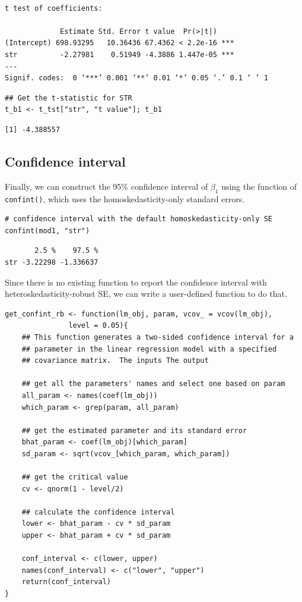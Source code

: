 \documentclass[11pt]{article}
\begin{document}
\begin{verbatim}

t test of coefficients:

             Estimate Std. Error t value  Pr(>|t|)
(Intercept) 698.93295   10.36436 67.4362 < 2.2e-16 ***
str          -2.27981    0.51949 -4.3886 1.447e-05 ***
---
Signif. codes:  0 ‘***’ 0.001 ‘**’ 0.01 ‘*’ 0.05 ‘.’ 0.1 ‘ ’ 1
\end{verbatim}

\begin{verbatim}
## Get the t-statistic for STR
t_b1 <- t_tst["str", "t value"]; t_b1
\end{verbatim}

\begin{verbatim}
[1] -4.388557
\end{verbatim}


\subsection*{Confidence interval}
\label{sec:org136b84d}

Finally, we can construct the 95\% confidence interval of \(\beta_1\)
using the function of \texttt{confint()}, which uses the
homoskedasticity-only standard errors.
\begin{verbatim}
# confidence interval with the default homoskedasticity-only SE
confint(mod1, "str")
\end{verbatim}

\begin{verbatim}
       2.5 %    97.5 %
str -3.22298 -1.336637
\end{verbatim}

Since there is no existing function to report the confidence interval
with heteroskedasticity-robust SE, we can write a user-defined
function to do that.

\begin{verbatim}
get_confint_rb <- function(lm_obj, param, vcov_ = vcov(lm_obj),
			   level = 0.05){
    ## This function generates a two-sided confidence interval for a
    ## parameter in the linear regression model with a specified
    ## covariance matrix.  The inputs The output

    ## get all the parameters' names and select one based on param
    all_param <- names(coef(lm_obj))
    which_param <- grep(param, all_param)

    ## get the estimated parameter and its standard error
    bhat_param <- coef(lm_obj)[which_param]
    sd_param <- sqrt(vcov_[which_param, which_param])

    ## get the critical value
    cv <- qnorm(1 - level/2)

    ## calculate the confidence interval
    lower <- bhat_param - cv * sd_param
    upper <- bhat_param + cv * sd_param

    conf_interval <- c(lower, upper)
    names(conf_interval) <- c("lower", "upper")
    return(conf_interval)
}
\end{verbatim}
\end{document}
